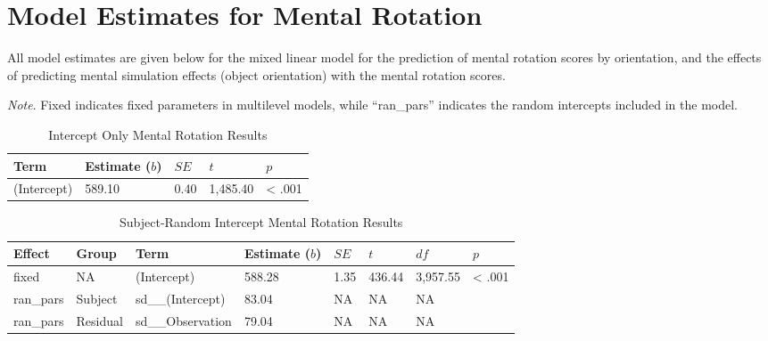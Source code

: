 \documentclass[
  man,mask,floatsintext]{apa7}
\begin{document}
\hypertarget{model-estimates-for-mental-rotation}{%
\section{Model Estimates for Mental Rotation}\label{model-estimates-for-mental-rotation}}

All model estimates are given below for the mixed linear model for the prediction of mental rotation scores by orientation, and the effects of predicting mental simulation effects (object orientation) with the mental rotation scores.

\emph{Note}. Fixed indicates fixed parameters in multilevel models, while ``ran\_pars'' indicates the random intercepts included in the model.

\newpage

\begin{table}[tbp]

\begin{center}
\begin{threeparttable}

\caption{\label{tab:intercept_e}Intercept Only Mental Rotation Results}

\begin{tabular}{lllll}
\toprule
Term & Estimate ($b$) & $SE$ & $t$ & $p$\\
\midrule
(Intercept) & 589.10 & 0.40 & 1,485.40 & < .001\\
\bottomrule
\end{tabular}

\end{threeparttable}
\end{center}

\end{table}

\begin{table}[tbp]

\begin{center}
\begin{threeparttable}

\caption{\label{tab:subject_e}Subject-Random Intercept Mental Rotation Results}

\begin{tabular}{llllllll}
\toprule
Effect & Group & Term & Estimate ($b$) & $SE$ & $t$ & $df$ & $p$\\
\midrule
fixed & NA & (Intercept) & 588.28 & 1.35 & 436.44 & 3,957.55 & < .001\\
ran\_pars & Subject & sd\_\_(Intercept) & 83.04 & NA & NA & NA & \\
ran\_pars & Residual & sd\_\_Observation & 79.04 & NA & NA & NA & \\
\bottomrule
\end{tabular}

\end{threeparttable}
\end{center}

\end{table}
\end{document}
